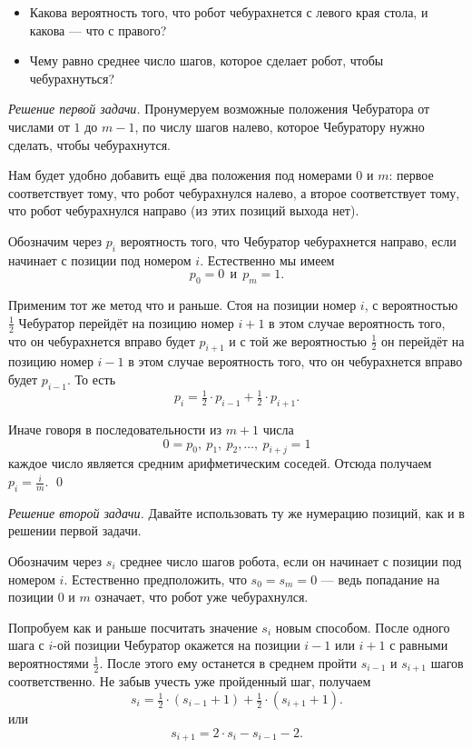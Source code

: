 \documentclass{article}
\begin{document}
\begin{itemize}
\item Какова вероятность того, что робот чебурахнется с левого края стола, и какова --- что с правого?
\item Чему равно среднее число шагов, которое сделает робот, чтобы чебурахнуться?
\end{itemize}

\medskip
\noindent\textit{Решение первой задачи.}
Пронумеруем возможные положения Чебуратора от числами от $1$ до $m-1$,
по числу шагов налево, которое Чебуратору нужно сделать, чтобы чебурахнутся.

Нам будет удобно добавить ещё два положения под номерами $0$ и $m$:
первое соответствует тому, что робот чебурахнулся налево, 
а второе соответствует тому, что робот чебурахнулся направо
(из этих позиций выхода нет).


Обозначим через $p_i$ вероятность того, 
что Чебуратор чебурахнется направо,
если начинает с позиции под номером $i$.
Естественно мы имеем 
\[p_0=0\ \  \text{и}\ \  p_{m}=1.\]

Применим тот же метод что и раньше.
Стоя на позиции номер $i$,
с вероятностью $\tfrac12$ Чебуратор перейдёт на позицию номер $i+1$
в этом случае вероятность того, 
что он чебурахнется вправо будет $p_{i+1}$
и с той же вероятностью $\tfrac12$ он перейдёт на позицию номер $i-1$
в этом случае вероятность того, что он чебурахнется вправо будет $p_{i-1}$.
То есть 
\[p_i=\tfrac12\cdot p_{i-1}+\tfrac12\cdot p_{i+1}.\]

Иначе говоря в последовательности из $m+1$ числа
\[0=p_0,\ p_1,\ p_2,\dots,\ p_{i+j}=1\] 
каждое число является средним арифметическим 
соседей.
Отсюда получаем $p_i=\tfrac im$.
\qed

\medskip
\noindent\textit{Решение второй задачи.}
Давайте использовать ту же нумерацию позиций, как и в решении первой задачи.

Обозначим через $s_i$ среднее число шагов робота, если он начинает с позиции под номером $i$.
Естественно предположить, что $s_0=s_{m}=0$ ---
ведь попадание на позиции $0$ и $m$ означает, что робот уже чебурахнулся.

Попробуем как и раньше посчитать значение $s_i$ новым способом.
После одного шага с $i$-ой позиции
Чебуратор окажется на позиции $i-1$ или $i+1$ с равными вероятностями $\tfrac12$.
После этого ему останется в среднем пройти $s_{i-1}$ и $s_{i+1}$ шагов соответственно. 
Не забыв учесть уже пройденный шаг,
получаем
\[s_i=\tfrac12\cdot(s_{i-1}+1)+\tfrac12\cdot(s_{i+1}+1).\]
или 
\[s_{i+1}=2\cdot s_i-s_{i-1}-2.\]
\end{document}
